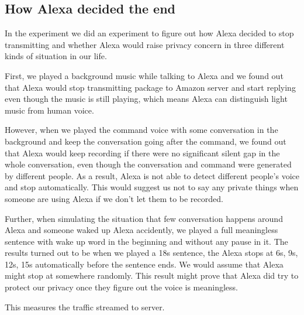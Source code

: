 \subsection{How Alexa decided the end}

In the experiment \todo{[3]} we did an experiment to figure out how Alexa decided to stop transmitting and whether Alexa would raise privacy concern in three different kinds of situation in our life.

First, we played a background music while talking to Alexa and we found out that Alexa would stop transmitting package to Amazon server and start replying even though the music is still playing, which means Alexa can distinguish light music from human voice.

However, when we played the command voice with some conversation in the background and keep the conversation going after the command, we found out that Alexa would keep recording if there were no significant silent gap in the whole conversation, even though the conversation and command were generated by different people. As a result, Alexa is not able to detect different people's voice and stop automatically. This would suggest us not to say any private things when someone are using Alexa if we don't let them to be recorded. 

Further, when simulating the situation that few conversation happens around Alexa and someone waked up Alexa accidently, we played a full meaningless sentence with wake up word in the beginning and without any pause in it. The results turned out to be when we played a 18s sentence, the Alexa stops at 6s, 9s, 12s, 15s automatically before the sentence ends. We would assume that Alexa might stop at somewhere randomly. This result might prove that Alexa did try to protect our privacy once they figure out the voice is meaningless.

This measures the traffic streamed to server.


